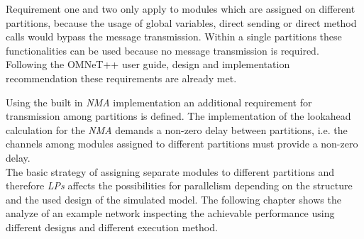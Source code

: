 Requirement one and two only apply to modules which are assigned on different partitions, because the usage of global variables, direct sending or direct method calls would bypass the message transmission.
Within a single partitions these functionalities can be used because no message transmission is required.
Following the OMNeT++ user guide, design and implementation recommendation these requirements are already met. \cite[section III.B]{varga_parallel_2003}

Using the built in \emph{NMA} implementation an additional requirement for transmission among partitions is defined.
The implementation of the lookahead calculation for the \emph{NMA} demands a non-zero delay between partitions, i.e. the channels among modules assigned to different partitions must provide a non-zero delay. \cite[section 16.3.1]{omnet_manual}
\\

The basic strategy of assigning separate modules to different partitions and therefore \emph{LPs} affects the possibilities for parallelism depending on the structure and the used design of the simulated model.
The following chapter shows the analyze of an example network inspecting the achievable performance using different designs and different execution method.